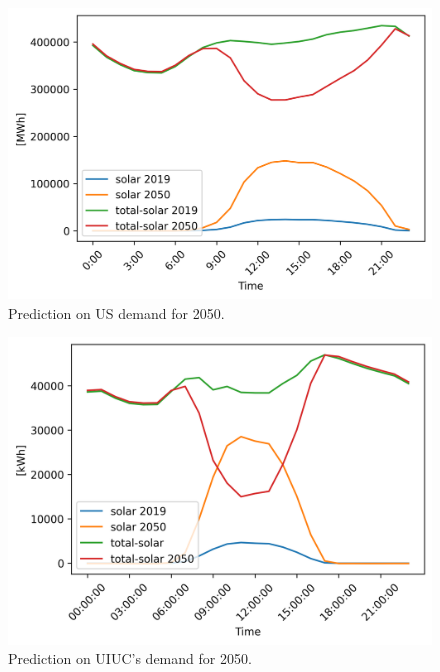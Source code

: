 \documentclass{anstrans}
\begin{document}
\begin{figure}[H]
	\centering
	\includegraphics[width=1.0\linewidth]{figures/duck-curve4.png}
	\hfill
	\caption{Prediction on US demand for 2050.}
	\label{fig:us-duck}
\end{figure}

\begin{figure}[H]
	\centering
	\includegraphics[width=1.0\linewidth]{figures/uiuc-duck.png}
	\hfill
	\caption{Prediction on UIUC's demand for 2050.}
	\label{fig:uiuc-duck}
\end{figure}
\end{document}
